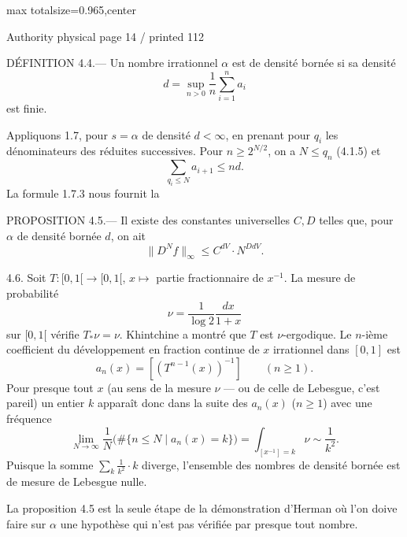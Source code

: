 \documentclass{article}
\begin{document}
\newpage
\noindent\begin{adjustbox}{max totalsize={\textwidth}{0.965\textheight},center}\begin{minipage}{\textwidth}
\noindent\hfill\scriptsize Authority physical page 14 / printed 112\par\normalsize
DÉFINITION 4.4.— Un nombre irrationnel \(\alpha\) est de densité bornée si sa densité
\[
d=\sup_{n>0}\frac1n\sum_{i=1}^{n}a_i
\]
est finie.

Appliquons 1.7, pour \(s=\alpha\) de densité \(d<\infty\), en prenant pour \(q_i\) les dénominateurs des réduites successives. Pour \(n\geq2^{N/2}\), on a \(N\leq q_n\) (4.1.5) et
\[
\sum_{q_i\leq N}a_{i+1}\leq nd.
\]
La formule 1.7.3 nous fournit la

PROPOSITION 4.5.— Il existe des constantes universelles \(C,D\) telles que, pour \(\alpha\) de densité bornée \(d\), on ait
\[
\|D^Nf\|_\infty\leq C^{dV}\cdot N^{DdV}.
\]

4.6. Soit \(T:[0,1[\to[0,1[\), \(x\longmapsto\) partie fractionnaire de \(x^{-1}\). La mesure de probabilité
\[
\nu=\frac1{\log2}\frac{dx}{1+x}
\]
sur \([0,1[\) vérifie \(T_*\nu=\nu\). Khintchine a montré que \(T\) est \(\nu\)-ergodique. Le \(n\)-ième coefficient du développement en fraction continue de \(x\) irrationnel dans \([0,1]\) est
\[
a_n(x)=[(T^{n-1}(x))^{-1}]\qquad(n\geq1).
\]
Pour presque tout \(x\) (au sens de la mesure \(\nu\) — ou de celle de Lebesgue, c’est pareil) un entier \(k\) apparaît donc dans la suite des \(a_n(x)\) (\(n\geq1\)) avec une fréquence
\[
\lim_{N\to\infty}\frac1N\bigl(\#\{n\leq N\mid a_n(x)=k\}\bigr)
=\int_{[x^{-1}]=k}\nu\sim\frac1{k^2}.
\]
Puisque la somme \(\sum_k\frac1{k^2}\cdot k\) diverge, l’ensemble des nombres de densité bornée est de mesure de Lebesgue nulle.

La proposition 4.5 est la seule étape de la démonstration d’Herman où l’on doive faire sur \(\alpha\) une hypothèse qui n’est pas vérifiée par presque tout nombre.
\end{minipage}\end{adjustbox}
\end{document}
